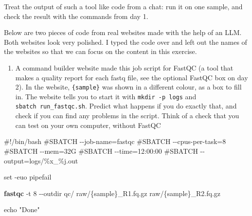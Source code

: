 \documentclass[
  letterpaper,
  DIV=11,
  numbers=noendperiod]{scrreprt}
\newenvironment{Shaded}{}{}
\newcommand{\AttributeTok}[1]{\textcolor[rgb]{0.84,0.23,0.29}{#1}}
\newcommand{\BuiltInTok}[1]{\textcolor[rgb]{0.84,0.23,0.29}{#1}}
\newcommand{\CommentTok}[1]{\textcolor[rgb]{0.42,0.45,0.49}{#1}}
\newcommand{\ExtensionTok}[1]{\textcolor[rgb]{0.84,0.23,0.29}{\textbf{#1}}}
\newcommand{\NormalTok}[1]{\textcolor[rgb]{0.14,0.16,0.18}{#1}}
\newcommand{\StringTok}[1]{\textcolor[rgb]{0.01,0.18,0.38}{#1}}
\providecommand{\tightlist}{%
  \setlength{\itemsep}{0pt}\setlength{\parskip}{0pt}}
\begin{document}
Treat the output of such a tool like code from a chat: run it on one
sample, and check the result with the commands from day 1.

\begin{tcolorbox}[enhanced jigsaw, title=\textcolor{quarto-callout-color}{\faInfo}\hspace{0.5em}{Exercise}, rightrule=.15mm, titlerule=0mm, colframe=quarto-callout-color-frame, toprule=.15mm, leftrule=.75mm, colbacktitle=quarto-callout-color!10!white, bottomtitle=1mm, toptitle=1mm, arc=.35mm, opacitybacktitle=0.6, left=2mm, bottomrule=.15mm, breakable, opacityback=0, colback=white, coltitle=black]

Below are two pieces of code from real websites made with the help of an
LLM. Both websites look very polished. I typed the code over and left
out the names of the websites so that we can focus on the content in
this exercise.

\begin{enumerate}
\def\labelenumi{\arabic{enumi}.}
\tightlist
\item
  A command builder website made this job script for FastQC (a tool that
  makes a quality report for each fastq file, see the optional FastQC
  box on day 2). In the website, \texttt{\{sample\}} was shown in a
  different colour, as a box to fill in. The website tells you to start
  it with \texttt{mkdir\ -p\ logs} and \texttt{sbatch\ run\_fastqc.sh}.
  Predict what happens if you do exactly that, and check if you can find
  any problems in the script. Think of a check that you can test on your
  own computer, without FastQC
\end{enumerate}

\begin{Shaded}
\begin{Highlighting}[]
\CommentTok{\#!/bin/bash}
\CommentTok{\#SBATCH {-}{-}job{-}name=fastqc}
\CommentTok{\#SBATCH {-}{-}cpus{-}per{-}task=8}
\CommentTok{\#SBATCH {-}{-}mem=32G}
\CommentTok{\#SBATCH {-}{-}time=12:00:00}
\CommentTok{\#SBATCH {-}{-}output=logs/\%x\_\%j.out}

\BuiltInTok{set} \AttributeTok{{-}euo}\NormalTok{ pipefail}

\ExtensionTok{fastqc} \AttributeTok{{-}t}\NormalTok{ 8 }\AttributeTok{{-}{-}outdir}\NormalTok{ qc/ raw/\{sample\}\_R1.fq.gz raw/\{sample\}\_R2.fq.gz}

\BuiltInTok{echo} \StringTok{"Done"}
\end{Highlighting}
\end{Shaded}


\end{tcolorbox}
\end{document}

